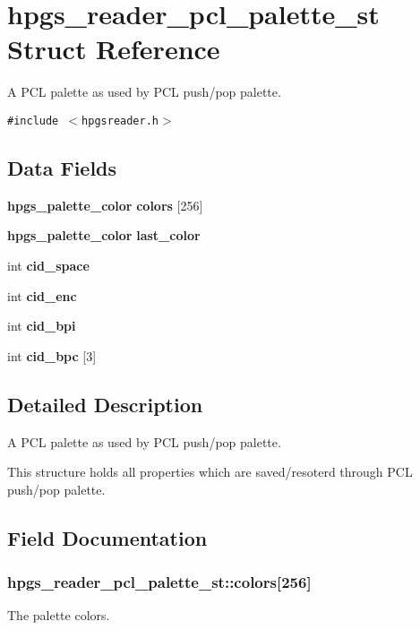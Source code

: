 \section{hpgs\_\-reader\_\-pcl\_\-palette\_\-st Struct Reference}
\label{structhpgs__reader__pcl__palette__st}
A PCL palette as used by PCL push/pop palette.  


{\tt \#include $<$hpgsreader.h$>$}

\subsection*{Data Fields}
\begin{CompactItemize}
\item 
{\bf hpgs\_\-palette\_\-color} {\bf colors} [256]
\item 
{\bf hpgs\_\-palette\_\-color} {\bf last\_\-color}
\item 
int {\bf cid\_\-space}
\item 
int {\bf cid\_\-enc}
\item 
int {\bf cid\_\-bpi}
\item 
int {\bf cid\_\-bpc} [3]
\end{CompactItemize}


\subsection{Detailed Description}
A PCL palette as used by PCL push/pop palette. 

This structure holds all properties which are saved/resoterd through PCL push/pop palette. 

\subsection{Field Documentation}
\subsubsection[colors]{ {\bf hpgs\_\-reader\_\-pcl\_\-palette\_\-st::colors}[256]}\label{structhpgs__reader__pcl__palette__st_4efdd1a3a0373c21a1c98b64033f15d9}


The palette colors. 
